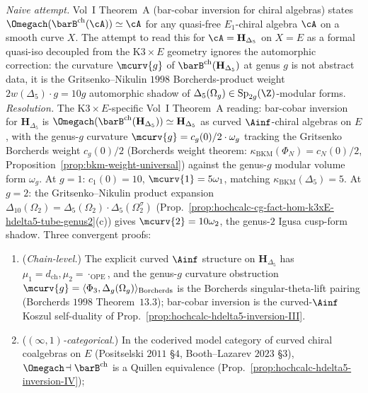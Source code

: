\begin{proposition}
\label{prop:hochcalc-hdelta5-inversion-V}
\emph{Naive attempt.} Vol~I Theorem~A (bar-cobar inversion for chiral
algebras) states $\Omegach(\barB^{\mathrm{ch}}(\cA))\simeq\cA$
for any quasi-free $E_1$-chiral algebra $\cA$ on a smooth curve
$X$. The attempt to read this for $\cA=\mathbf H_{\Delta_5}$ on
$X=E$ as a formal quasi-iso decoupled from the K$3\times E$
geometry ignores the automorphic correction: the curvature
$\mcurv{g}$ of $\barB^{\mathrm{ch}}(\mathbf H_{\Delta_5})$ at genus
$g$ is not abstract data, it is the Gritsenko--Nikulin $1998$
Borcherds-product weight $2w(\Delta_5)\cdot g=10g$ automorphic
shadow of $\Delta_5(\Omega_g)\in\mathrm{Sp}_{2g}(\Z)$-modular
forms. \emph{Resolution.} The K$3\times E$-specific Vol~I Theorem~A
reading: bar-cobar inversion for $\mathbf H_{\Delta_5}$ is
$\Omegach(\barB^{\mathrm{ch}}(\mathbf H_{\Delta_5}))\simeq\mathbf
H_{\Delta_5}$ as curved $\Ainf$-chiral algebras on $E$, with
the genus-$g$ curvature
$\mcurv{g}=c_g(0)/2\cdot\omega_g$ tracking the Gritsenko Borcherds
weight $c_g(0)/2$ (Borcherds weight theorem: $\kappa_{\mathrm{BKM}}(\Phi_N)=c_N(0)/2$,
Proposition~\ref{prop:bkm-weight-universal}) against the
genus-$g$ modular volume form $\omega_g$. At $g=1$: $c_1(0)=10$,
$\mcurv{1}=5\omega_1$, matching
$\kappa_{\mathrm{BKM}}(\Delta_5)=5$. At $g=2$: the
Gritsenko--Nikulin product expansion
$\Delta_{10}(\Omega_2)=\Delta_5(\Omega_2)\cdot\Delta_5(\Omega_2^\sigma)$
(Prop.~\ref{prop:hochcalc-cg-fact-hom-k3xE-hdelta5-tube-genus2}(c))
gives $\mcurv{2}=10\omega_2$, the genus-$2$ Igusa cusp-form
shadow. Three convergent proofs:
\begin{enumerate}[label=(\roman*),leftmargin=1.5em]
 \item (\emph{Chain-level.}) The explicit curved $\Ainf$
 structure on $\mathbf H_{\Delta_5}$ has
 $\mu_1=d_{\mathrm{ch}},\mu_2=\cdot_{\mathrm{OPE}}$, and the
 genus-$g$ curvature obstruction
 $\mcurv{g}=\langle\Phi_3,\Delta_g(\Omega_g)\rangle_{\mathrm{Borcherds}}$
 is the Borcherds singular-theta-lift pairing
 (Borcherds $1998$ Theorem~$13.3$); bar-cobar inversion is the
 curved-$\Ainf$ Koszul self-duality of
 Prop.~\ref{prop:hochcalc-hdelta5-inversion-III}.
 \item (\emph{$(\infty,1)$-categorical.}) In the coderived
 model category of curved chiral coalgebras on $E$
 (Positselski $2011$ \S$4$, Booth--Lazarev $2023$ \S$3$),
 $\Omegach\!\dashv\barB^{\mathrm{ch}}$ is a Quillen equivalence
 (Prop.~\ref{prop:hochcalc-hdelta5-inversion-IV});

\end{enumerate}
\end{proposition}
